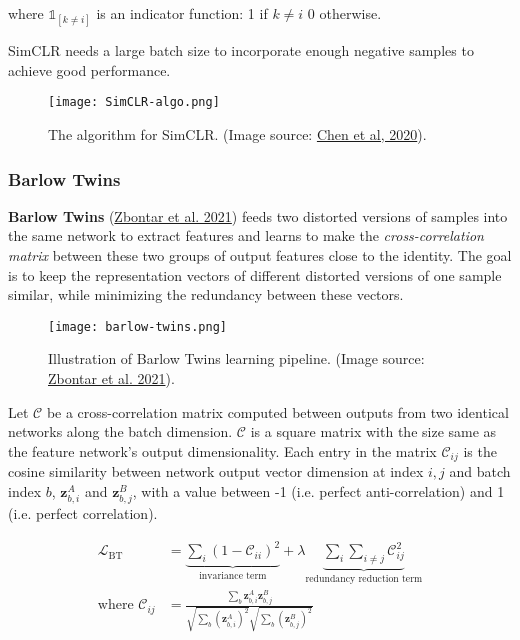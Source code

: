 \documentclass[12pt]{article}
\begin{document}
where $\mathbb{1}_{[k \neq i]}$ is an indicator function: 1 if $k\neq i$ 0 otherwise.

SimCLR needs a large batch size to incorporate enough negative samples to achieve good performance.

\begin{figure}[H]
    \centering
    \texttt{[image: SimCLR-algo.png]}
    \caption{The algorithm for SimCLR. (Image source: \href{https://arxiv.org/abs/2002.05709}{Chen et al, 2020}).}
\end{figure}

\subsubsection{Barlow Twins}

\textbf{Barlow Twins} (\href{https://arxiv.org/abs/2103.03230}{Zbontar et al. 2021}) feeds two distorted versions of samples into the same network to extract features and learns to make the \emph{cross-correlation matrix} between these two groups of output features close to the identity. The goal is to keep the representation vectors of different distorted versions of one sample similar, while minimizing the redundancy between these vectors.

\begin{figure}[H]
    \centering
    \texttt{[image: barlow-twins.png]}
    \caption{Illustration of Barlow Twins learning pipeline. (Image source: \href{https://arxiv.org/abs/2103.03230}{Zbontar et al. 2021}).}
\end{figure}

Let $\mathcal{C}$ be a cross-correlation matrix computed between outputs from two identical networks along the batch dimension. $\mathcal{C}$ is a square matrix with the size same as the feature network's output dimensionality. Each entry in the matrix $\mathcal{C}_{ij}$ is the cosine similarity between network output vector dimension at index $i, j$ and batch index $b$, $\mathbf{z}_{b,i}^A$ and $\mathbf{z}_{b,j}^B$, with a value between -1 (i.e. perfect anti-correlation) and 1 (i.e. perfect correlation).

\[
\begin{aligned}
\mathcal{L}_\text{BT} &= \underbrace{\sum_i (1-\mathcal{C}_{ii})^2}_\text{invariance term} + \lambda \underbrace{\sum_i\sum_{i\neq j} \mathcal{C}_{ij}^2}_\text{redundancy reduction term} \\ \text{where } \mathcal{C}_{ij} &= \frac{\sum_b \mathbf{z}^A_{b,i} \mathbf{z}^B_{b,j}}{\sqrt{\sum_b (\mathbf{z}^A_{b,i})^2}\sqrt{\sum_b (\mathbf{z}^B_{b,j})^2}}
\end{aligned}
\]
\end{document}
